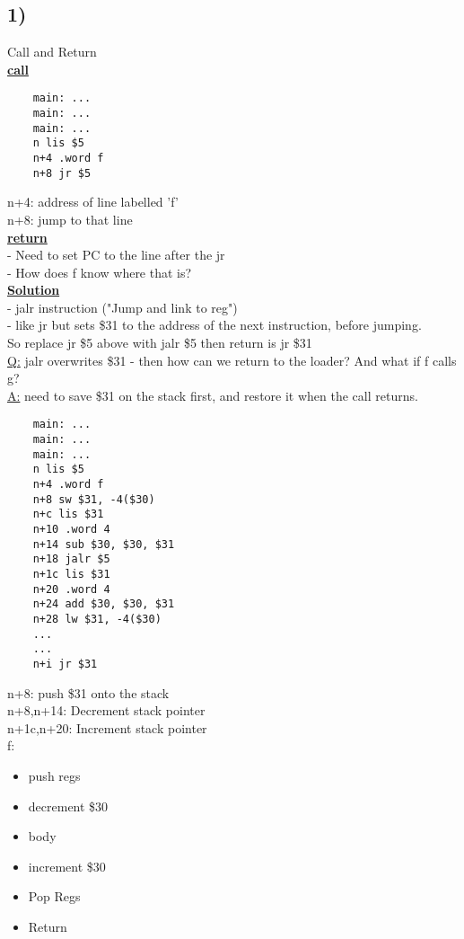 \documentclass[12pt]{article}
\newcommand{\myt}[1]{\textbf{\underline{#1}}}
\begin{document}
	\subsection*{1)}
	Call and Return\\
	\myt{call}
	\lstset{language=[mips]Assembler}
	\begin{lstlisting}
	main: ...
	main: ...
	main: ...
	n lis $5
	n+4 .word f
	n+8 jr $5
	\end{lstlisting}
	n+4: address of line labelled 'f'\\
	n+8: jump to that line\\
	
	\myt{return}\\
	- Need to set PC to the line after the jr\\
	- How does f know where that is?\\
	
	\myt{Solution}\\
	- jalr instruction ("Jump and link to reg")\\
	- like jr but sets \$31 to the address of the next instruction, before jumping.\\
	So replace jr \$5 above with jalr \$5 then return is jr \$31\\
	
	\underline{Q:} jalr overwrites \$31 - then how can we return to the loader? And what if f calls g?\\
	
	\underline{A:} need to save \$31 on the stack first, and restore it when the call returns.\\
	\lstset{language=[mips]Assembler}
	\begin{lstlisting}
	main: ...
	main: ...
	main: ...
	n lis $5
	n+4 .word f
	n+8 sw $31, -4($30)
	n+c lis $31
	n+10 .word 4
	n+14 sub $30, $30, $31
	n+18 jalr $5
	n+1c lis $31
	n+20 .word 4
	n+24 add $30, $30, $31
	n+28 lw $31, -4($30)
	...
	...
	n+i jr $31
	\end{lstlisting}
	n+8: push \$31 onto the stack\\
	n+8,n+14: Decrement stack pointer\\
	n+1c,n+20: Increment stack pointer\\
	
	f:
	\begin{itemize}
		\item push regs
		\item decrement \$30
		\item body
		\item increment \$30
		\item Pop Regs
		\item Return
	\end{itemize}
	
\end{document}
